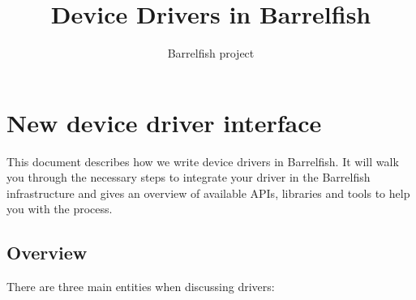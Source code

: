 \documentclass[a4paper,11pt,twoside]{report}
\title{Device Drivers in Barrelfish}
\author{Barrelfish project}
\begin{document}
\maketitle			%

\begin{versionhistory}
\end{versionhistory}

\tableofcontents		%
\cleardoublepage
\setcounter{secnumdepth}{2}

\newcommand{\fnname}[1]{\textit{\texttt{#1}}}%
\newcommand{\datatype}[1]{\textit{\texttt{#1}}}%
\newcommand{\varname}[1]{\texttt{#1}}%
\newcommand{\keywname}[1]{\textbf{\texttt{#1}}}%
\newcommand{\pathname}[1]{\texttt{#1}}%
\newcommand{\tabindent}{\hspace*{3ex}}%


\chapter{New device driver interface}
\label{chap:introduction}

This document describes how we write device drivers in Barrelfish. It will walk
you through the necessary steps to integrate your driver in the Barrelfish
infrastructure and gives an overview of available APIs, libraries and tools to
help you with the process.

\section{Overview}
\label{chap:overview}

There are three main entities when discussing drivers:
\end{document}
